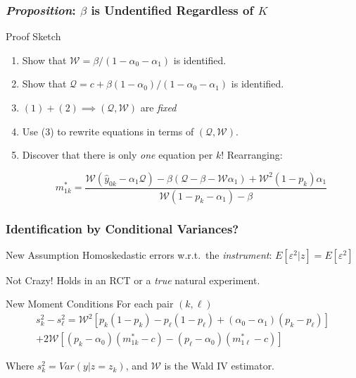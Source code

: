 \documentclass{beamer}
\begin{document}
\begin{frame}
  \frametitle{\emph{Proposition}: $\beta$ is Undentified Regardless of $K$}
  \begin{block}{Proof Sketch}
    \begin{enumerate}[(1)]
      \item Show that $\mathcal{W}= \beta/(1-\alpha_0 - \alpha_1)$ is identified. 
      \item Show that $\mathcal{Q} = c + \beta(1-\alpha_0)/(1-\alpha_0-\alpha_1)$ is identified.
      \item $(1) + (2) \implies (\mathcal{Q}, \mathcal{W})$ are \emph{fixed}
      \item Use (3) to rewrite equations in terms of $(\mathcal{Q}, \mathcal{W})$.
      \item Discover that there is only \emph{one} equation per $k$! Rearranging: 

        \[m^*_{1k} = \frac{\mathcal{W}(\hat{y}_{0k}-\alpha_1 \mathcal{Q}) - \beta(\mathcal{Q}-\beta-\mathcal{W}\alpha_1) + \mathcal{W}^2(1-p_k)\alpha_1}{\mathcal{W}(1-p_k - \alpha_1) - \beta}\]
    \end{enumerate}

  \end{block} 
    
\end{frame}
\begin{frame}
  \frametitle{Identification by Conditional Variances?} 
  \begin{block}{New Assumption}
    Homoskedastic errors w.r.t.\ the \emph{instrument}: $E[\varepsilon^2|z]=E[\varepsilon^2]$
  \end{block}
  \begin{block}{Not Crazy!}
    Holds in an RCT or a \emph{true} natural experiment.
  \end{block}
  \begin{alertblock}{New Moment Conditions}
    For each pair $(k,\ell)$
\begin{align*}
  s^2_k - s^2_\ell = \mathcal{W}^2\left[p_k(1-p_k) - p_\ell(1-p_\ell) + (\alpha_0 - \alpha_1)(p_k - p_\ell)\right]\\  
  + 2\mathcal{W}\left[(p_k - \alpha_0)(m^*_{1k}-c) - (p_\ell - \alpha_0)(m^*_{1\ell}-c)\right]
\end{align*}

\vspace{0.5em}
Where $s^2_k = Var(y|z=z_k)$, and $\mathcal{W}$ is the Wald IV estimator. 
  \end{alertblock}
\end{frame}
\end{document}
